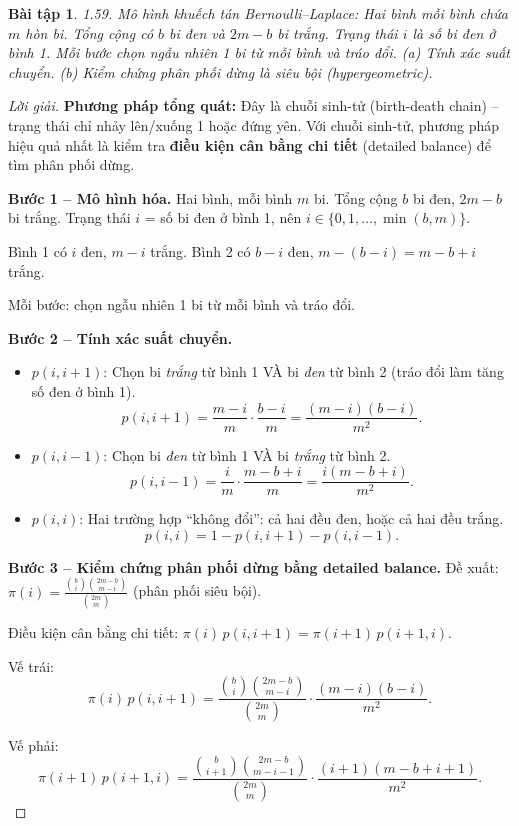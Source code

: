 \documentclass[8pt,a4paper]{article}
\newtheorem{exercise}{Bài tập}
\newenvironment{solution}{\begin{proof}[Lời giải]}{\end{proof}}
\begin{document}
\begin{exercise}
1.59. Mô hình khuếch tán Bernoulli–Laplace: Hai bình mỗi bình chứa $m$ hòn bi. Tổng cộng có $b$ bi đen và $2m-b$ bi trắng. Trạng thái $i$ là số bi đen ở bình 1. Mỗi bước chọn ngẫu nhiên 1 bi từ mỗi bình và tráo đổi.
(a) Tính xác suất chuyển. (b) Kiểm chứng phân phối dừng là siêu bội (hypergeometric).
\end{exercise}
\begin{solution}
\textbf{Phương pháp tổng quát:} Đây là chuỗi sinh-tử (birth-death chain) -- trạng thái chỉ nhảy lên/xuống 1 hoặc đứng yên. Với chuỗi sinh-tử, phương pháp hiệu quả nhất là kiểm tra \textbf{điều kiện cân bằng chi tiết} (detailed balance) để tìm phân phối dừng.

\textbf{Bước 1 -- Mô hình hóa.}
Hai bình, mỗi bình $m$ bi. Tổng cộng $b$ bi đen, $2m-b$ bi trắng. Trạng thái $i$ = số bi đen ở bình 1, nên $i \in \{0, 1, \ldots, \min(b, m)\}$.

Bình 1 có $i$ đen, $m-i$ trắng. Bình 2 có $b-i$ đen, $m-(b-i) = m-b+i$ trắng.

Mỗi bước: chọn ngẫu nhiên 1 bi từ mỗi bình và tráo đổi.

\textbf{Bước 2 -- Tính xác suất chuyển.}
\begin{itemize}[nosep]
  \item $p(i, i+1)$: Chọn bi \textit{trắng} từ bình 1 VÀ bi \textit{đen} từ bình 2 (tráo đổi làm tăng số đen ở bình 1).
  \[
    p(i, i+1) = \frac{m-i}{m} \cdot \frac{b-i}{m} = \frac{(m-i)(b-i)}{m^2}.
  \]
  \item $p(i, i-1)$: Chọn bi \textit{đen} từ bình 1 VÀ bi \textit{trắng} từ bình 2.
  \[
    p(i, i-1) = \frac{i}{m} \cdot \frac{m-b+i}{m} = \frac{i(m-b+i)}{m^2}.
  \]
  \item $p(i, i)$: Hai trường hợp ``không đổi'': cả hai đều đen, hoặc cả hai đều trắng.
  \[
    p(i, i) = 1 - p(i, i+1) - p(i, i-1).
  \]
\end{itemize}

\textbf{Bước 3 -- Kiểm chứng phân phối dừng bằng detailed balance.}
Đề xuất: $\pi(i) = \frac{\binom{b}{i}\binom{2m-b}{m-i}}{\binom{2m}{m}}$ (phân phối siêu bội).

Điều kiện cân bằng chi tiết: $\pi(i)\, p(i, i+1) = \pi(i+1)\, p(i+1, i)$.

Vế trái:
\[
  \pi(i)\, p(i, i+1) = \frac{\binom{b}{i}\binom{2m-b}{m-i}}{\binom{2m}{m}} \cdot \frac{(m-i)(b-i)}{m^2}.
\]

Vế phải:
\[
  \pi(i+1)\, p(i+1, i) = \frac{\binom{b}{i+1}\binom{2m-b}{m-i-1}}{\binom{2m}{m}} \cdot \frac{(i+1)(m-b+i+1)}{m^2}.
\]


\end{solution}
\end{document}
